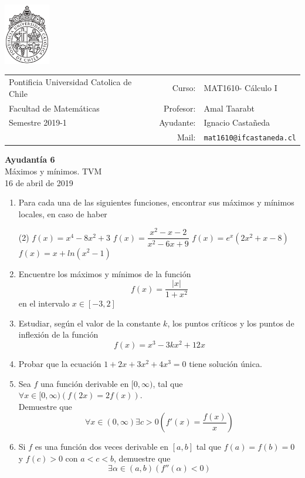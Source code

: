 \documentclass[12pt]{article}
\makeatletter
\newenvironment{preguntas}
{\begin{enumerate}\itemsep12pt
	}
	{
	\end{enumerate}
}
\newcommand{\ayudantia}{{\sc Ayudantía 6}}
\newcommand{\tituloayu}{Máximos y mínimos. TVM}
\newcommand{\fecha}{16 de abril de 2019}
\newcommand{\sigla}{MAT1610}
\newcommand{\nombre}{Cálculo I}
\newcommand{\profesor}{Amal Taarabt}
\newcommand{\ano}{2019}
\newcommand{\semestre}{1}
\newcommand{\mail}{mat1610@ifcastaneda.cl}
\makeatother
\begin{document}
\thispagestyle{empty}

\begin{minipage}{2cm}
	\includegraphics[width=2cm]{../../../../img/logo.pdf}
	\vspace{0.5cm}
\end{minipage}
\begin{minipage}{\linewidth}
	\begin{tabular}{lrl}
		{\scriptsize\sc Pontificia Universidad Catolica de Chile} & \hspace*{0.7in}Curso: &
		\sigla  - \nombre\\
		{\sc Facultad de Matemáticas}&
		Profesor: & \profesor \\
		{\sc Semestre \ano-\semestre} & Ayudante: & {Ignacio Castañeda}\\
		& {Mail:} & \texttt{\mail}
	\end{tabular}
\end{minipage}

\vspace{-10mm}
\begin{center}
	{\LARGE\bf \ayudantia}\\
	\vspace{0.1cm}
	{\tituloayu}\\
	\vspace{0.1cm}
	\fecha\\
	\vspace{0.4cm}
\end{center}

\begin{preguntas}
\item Para cada una de las siguientes funciones, encontrar sus máximos y mínimos locales, en caso de haber
\begin{tasks}(2)
\task $f(x) = x^4 - 8x^2 + 3$
\task $f(x) = \dfrac{x^2-x-2}{x^2-6x+9}$
\task $f(x) = e^x(2x^2+x-8)$
\task $f(x)=x+ln(x^2-1)$
\end{tasks}
\item Encuentre los máximos y mínimos de la función
$$f(x) = \dfrac{|x|}{1+x^2}$$
en el intervalo $x \in [-3,2]$
\item Estudiar, según el valor de la constante $k$, los puntos críticos y los puntos de inflexión de la función
$$f(x) = x^3-3kx^2+12x$$
\item Probar que la ecuación $1+2x+3x^2+4x^3=0$ tiene solución única.
\item Sea $f$ una función derivable en $[0, \infty)$, tal que $\forall x \in [0, \infty)(f(2x)=2f(x))$.\\
Demuestre que
$$\forall x \in (0, \infty) \exists c > 0 \left(f'(x) = \dfrac{f(x)}{x}\right)$$
\item Si $f$ es una función dos veces derivable en $[a,b]$ tal que $f(a)=f(b)=0$ y $f(c) > 0$ con $a < c < b$, demuestre que
$$\exists \alpha \in (a,b) (f''(\alpha) < 0)$$
\end{preguntas}
\end{document}
